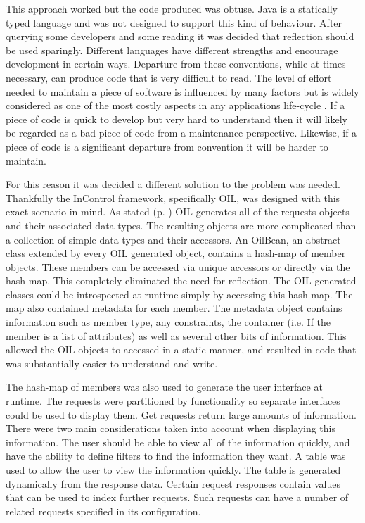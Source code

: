 \documentclass[a4paper, 11pt, titlepage]{article}
\begin{document}
This approach worked but the code produced was obtuse. Java is a statically typed language and was not designed to support this kind of behaviour. After querying some developers and some reading it was decided that reflection should be used sparingly. Different languages have different strengths and encourage development in certain ways. Departure from these conventions, while at times necessary, can produce code that is very difficult to read. The level of effort needed to maintain a piece of software is influenced by many factors \cite{cocomo} but is widely considered as one of the most costly aspects in any applications life-cycle \cite{software_maintenance} . If a piece of code is quick to develop but very hard to understand then it will likely be regarded as a bad piece of code from a maintenance perspective. Likewise, if a piece of code is a significant departure from convention it will be harder to maintain.

For this reason it was decided a different solution to the problem was needed. Thankfully the InControl framework, specifically OIL, was designed with this exact scenario in mind. As stated (p. \pageref{OILIntro}) OIL generates all of the requests objects and their associated data types. The resulting objects are more complicated than a collection of simple data types and their accessors. An OilBean, an abstract class extended by every OIL generated object, contains a hash-map of member objects. These members can be accessed via unique accessors or directly via the hash-map. This completely eliminated the need for reflection. The OIL generated classes could be introspected at runtime simply by accessing this hash-map. The map also contained metadata for each member. \label{metadata} The metadata object contains information such as member type, any constraints, the container (i.e. If the member is a list of attributes) as well as several other bits of information. This allowed the OIL objects to accessed in a static manner, and resulted in code that was substantially easier to understand and write.

The hash-map of members was also used to generate the user interface at runtime. The requests were partitioned by functionality so separate interfaces could be used to display them. Get requests return large amounts of information. There were two main considerations taken into account when displaying this information. The user should be able to view all of the information quickly, and have the ability to define filters to find the information they want. A table was used to allow the user to view the information quickly. The table is generated dynamically from the response data. Certain request responses contain values that can be used to index further requests. Such requests can have a number of related requests specified in its configuration.  
 
\end{document}
